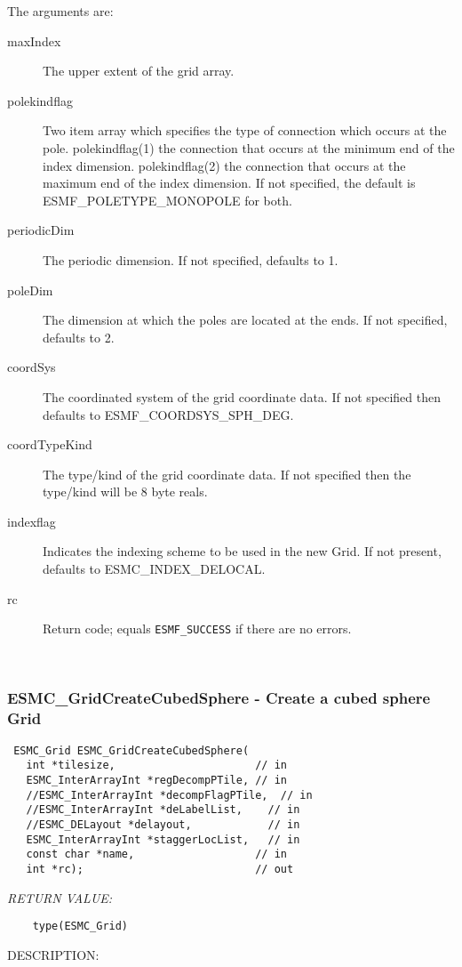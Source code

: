     The arguments are:
    \begin{description}
    \item[maxIndex]
        The upper extent of the grid array.
    \item[polekindflag]
        Two item array which specifies the type of connection which occurs at the
        pole. polekindflag(1) the connection that occurs at the minimum end of the
        index dimension. polekindflag(2) the connection that occurs at the maximum
        end of the index dimension. If not specified, the default is
        ESMF\_POLETYPE\_MONOPOLE for both.
    \item[periodicDim]
        The periodic dimension.  If not specified, defaults to 1.
    \item[poleDim]
        The dimension at which the poles are located at the ends.  If not
        specified, defaults to 2.
    \item[coordSys]
        The coordinated system of the grid coordinate data. If not specified then
        defaults to ESMF\_COORDSYS\_SPH\_DEG.
    \item[coordTypeKind]
        The type/kind of the grid coordinate data.  If not specified then the
        type/kind will be 8 byte reals.
    \item[indexflag]
        Indicates the indexing scheme to be used in the new Grid. If not present,
        defaults to ESMC\_INDEX\_DELOCAL.
    \item[rc]
        Return code; equals {\tt ESMF\_SUCCESS} if there are no errors.
    \end{description}
   
 
\mbox{}\hrulefill\ 
 
\subsubsection [ESMC\_GridCreateCubedSphere] {ESMC\_GridCreateCubedSphere - Create a cubed sphere Grid}


  
\begin{verbatim} ESMC_Grid ESMC_GridCreateCubedSphere(
   int *tilesize,                      // in
   ESMC_InterArrayInt *regDecompPTile, // in
   //ESMC_InterArrayInt *decompFlagPTile,  // in
   //ESMC_InterArrayInt *deLabelList,    // in
   //ESMC_DELayout *delayout,            // in
   ESMC_InterArrayInt *staggerLocList,   // in
   const char *name,                   // in
   int *rc);                           // out\end{verbatim}{\em RETURN VALUE:}
\begin{verbatim}    type(ESMC_Grid)\end{verbatim}
{\sf DESCRIPTION:\\ }


